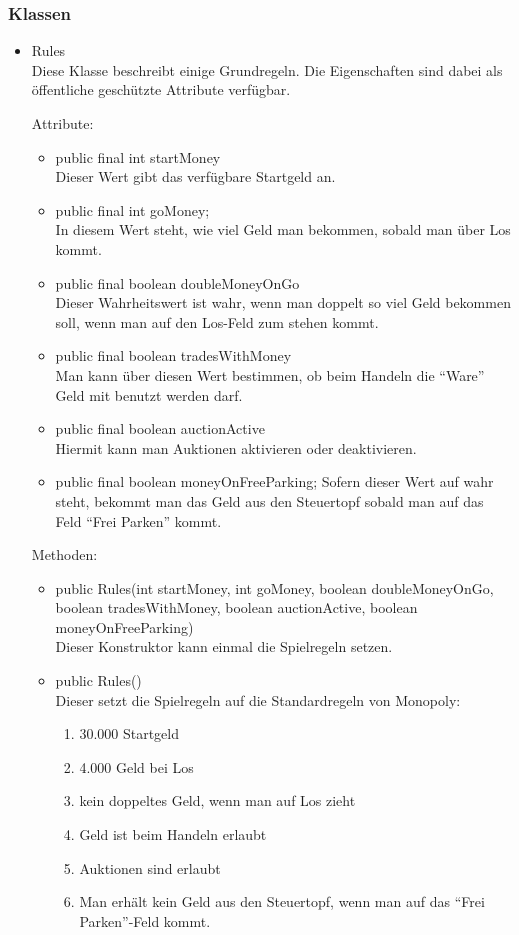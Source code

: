 \documentclass[a4paper,10pt]{article}
\begin{document}
\subsubsection{Klassen}
\begin{itemize}
\item Rules \\
Diese Klasse beschreibt einige Grundregeln. Die Eigenschaften sind dabei als öffentliche geschützte Attribute verfügbar.

Attribute:
\begin{itemize}
\item public final int startMoney \\
Dieser Wert gibt das verfügbare Startgeld an.
\item public final int goMoney; \\
In diesem Wert steht, wie viel Geld man bekommen, sobald man über Los kommt.
\item public final boolean doubleMoneyOnGo \\
Dieser Wahrheitswert ist wahr, wenn man doppelt so viel Geld bekommen soll, wenn man auf den Los-Feld zum stehen kommt.
\item public final boolean tradesWithMoney \\
Man kann über diesen Wert bestimmen, ob beim Handeln die "`Ware"' Geld mit benutzt werden darf.
\item public final boolean auctionActive \\
Hiermit kann man Auktionen aktivieren oder deaktivieren.
\item public final boolean moneyOnFreeParking;
Sofern dieser Wert auf wahr steht, bekommt man das Geld aus den Steuertopf sobald man auf das Feld "`Frei Parken"' kommt.
\end{itemize}

Methoden:
\begin{itemize}
\item public Rules(int startMoney, int goMoney, boolean doubleMoneyOnGo, boolean tradesWithMoney, boolean auctionActive, boolean moneyOnFreeParking) \\
Dieser Konstruktor kann einmal die Spielregeln setzen.
\item public Rules() \\
Dieser setzt die Spielregeln auf die Standardregeln von Monopoly:
\begin{enumerate}
\item 30.000 Startgeld
\item 4.000 Geld bei Los
\item kein doppeltes Geld, wenn man auf Los zieht
\item Geld ist beim Handeln erlaubt
\item Auktionen sind erlaubt
\item Man erhält kein Geld aus den Steuertopf, wenn man auf das "`Frei Parken"'-Feld kommt.
\end{enumerate}
\end{itemize}
\end{itemize} %
\end{document}
